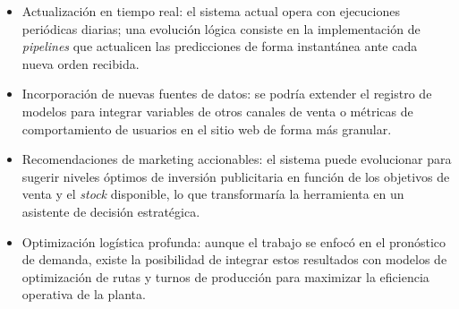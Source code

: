 \begin{itemize}
	\item Actualización en tiempo real: el sistema actual opera con ejecuciones periódicas diarias; una evolución lógica consiste en la implementación de \textit{pipelines} que actualicen las predicciones de forma instantánea ante cada nueva orden recibida. 
	\item Incorporación de nuevas fuentes de datos: se podría extender el registro de modelos para integrar variables de otros canales de venta o métricas de comportamiento de usuarios en el sitio web de forma más granular.
	\item Recomendaciones de marketing accionables: el sistema puede evolucionar para sugerir niveles óptimos de inversión publicitaria en función de los objetivos de venta y el \textit{stock} disponible, lo que transformaría la herramienta en un asistente de decisión estratégica.
	\item Optimización logística profunda: aunque el trabajo se enfocó en el pronóstico de demanda, existe la posibilidad de integrar estos resultados con modelos de optimización de rutas y turnos de producción para maximizar la eficiencia operativa de la planta.
	
\end{itemize}
